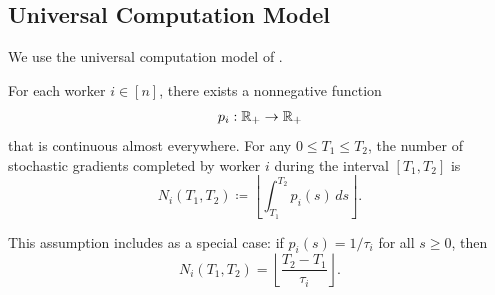 \documentclass{article}
\begin{document}
\subsection{Universal Computation Model}
\label{sec:universal_computation_model}
We use the universal computation model of \citet{tyurin2024tighttimecomplexitiesparallel}.
\begin{assumption}
    \label{assump:universal_time}
    For each worker $i \in [n]$, there exists a nonnegative function
    \begin{equation*}
        p_i : \mathbb{R}_{+} \to \mathbb{R}_{+}
    \end{equation*}
    that is continuous almost everywhere.
    For any $0 \le T_1 \le T_2$, the number of stochastic gradients completed by worker $i$ during the interval $[T_1,T_2]$ is
    \begin{equation*}
        N_i(T_1,T_2) \coloneqq \left\lfloor \int_{T_1}^{T_2} p_i(s)\,ds \right\rfloor .
    \end{equation*}
\end{assumption}
This assumption includes  as a special case: if $p_i(s)=1/\tau_i$ for all $s \ge 0$, then
\begin{equation*}
    N_i(T_1,T_2) = \left\lfloor \frac{T_2-T_1}{\tau_i} \right\rfloor .
\end{equation*}
% 
\end{document}
